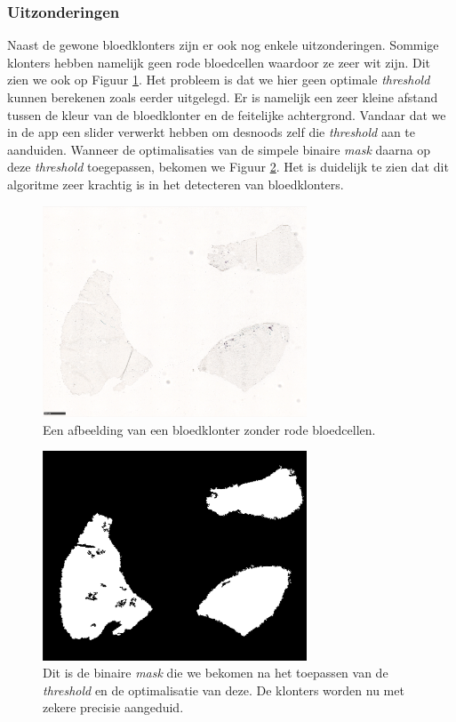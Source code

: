 \documentclass[a4paper,kulak]{kulakarticle}
\begin{document}
\subsubsection{Uitzonderingen}
Naast de gewone bloedklonters zijn er ook nog enkele uitzonderingen. Sommige klonters hebben namelijk geen rode bloedcellen waardoor ze zeer wit zijn. Dit zien we ook op Figuur \ref{figuur lichte_kleuring}. Het probleem is dat we hier geen optimale \textit{threshold} kunnen berekenen zoals eerder uitgelegd. Er is namelijk een zeer kleine afstand tussen de kleur van de bloedklonter en de feitelijke achtergrond. Vandaar dat we in de app een slider verwerkt hebben om desnoods zelf die \textit{threshold} aan te aanduiden. Wanneer de optimalisaties van de simpele binaire \textit{mask} daarna op deze \textit{threshold} toegepassen, bekomen we Figuur \ref{figuur lichte_kleuring_binair}. Het is duidelijk te zien dat dit algoritme zeer krachtig is in het detecteren van bloedklonters.

\begin{figure}[H]
	\centering
	\includegraphics[width=0.7\textwidth]{lichte_kleuring}
	
	\caption{Een afbeelding van een bloedklonter zonder rode bloedcellen.}
	\label{figuur lichte_kleuring}
\end{figure}

\begin{figure}[H]
	\centering
	\includegraphics[width=0.7\textwidth]{lichte_kleuring_binair}
	
	\caption{Dit is de binaire \textit{mask} die we bekomen na het toepassen van de \textit{threshold} en de optimalisatie van deze. De klonters worden nu met zekere precisie aangeduid.}
	\label{figuur lichte_kleuring_binair}
\end{figure}
\end{document}
